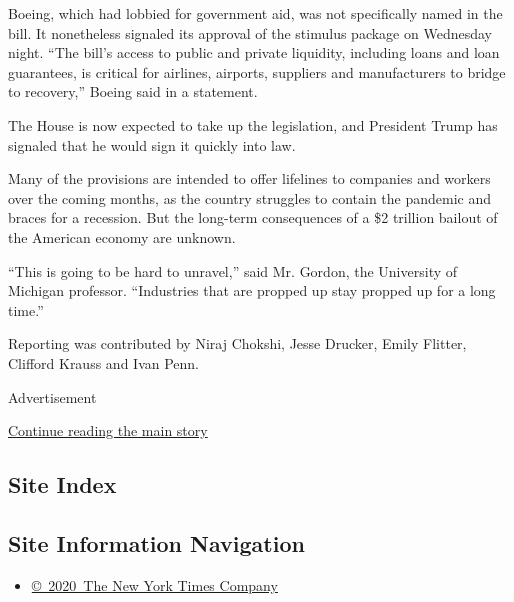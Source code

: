 Boeing, which had lobbied for government aid, was not specifically named
in the bill. It nonetheless signaled its approval of the stimulus
package on Wednesday night. ``The bill's access to public and private
liquidity, including loans and loan guarantees, is critical for
airlines, airports, suppliers and manufacturers to bridge to recovery,''
Boeing said in a statement.

The House is now expected to take up the legislation, and President
Trump has signaled that he would sign it quickly into law.

Many of the provisions are intended to offer lifelines to companies and
workers over the coming months, as the country struggles to contain the
pandemic and braces for a recession. But the long-term consequences of a
\$2 trillion bailout of the American economy are unknown.

``This is going to be hard to unravel,'' said Mr. Gordon, the University
of Michigan professor. ``Industries that are propped up stay propped up
for a long time.''

Reporting was contributed by Niraj Chokshi, Jesse Drucker, Emily
Flitter, Clifford Krauss and Ivan Penn.

Advertisement

\protect\hyperlink{after-bottom}{Continue reading the main story}

\hypertarget{site-index}{%
\subsection{Site Index}\label{site-index}}

\hypertarget{site-information-navigation}{%
\subsection{Site Information
Navigation}\label{site-information-navigation}}

\begin{itemize}
\tightlist
\item
  \href{https://help.nytimes3xbfgragh.onion/hc/en-us/articles/115014792127-Copyright-notice}{©~2020~The
  New York Times Company}
\end{itemize}

